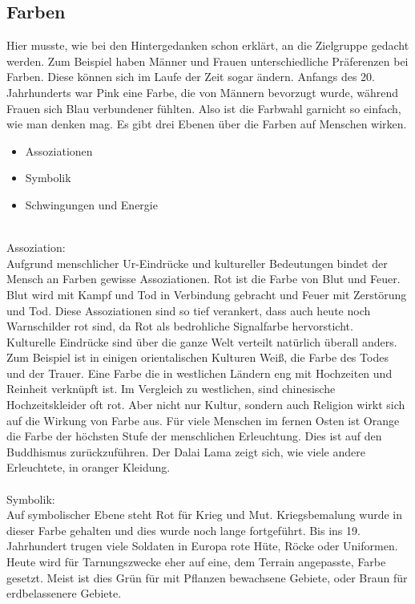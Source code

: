 \subsection{Farben}
Hier musste, wie bei den Hintergedanken schon erklärt, an die Zielgruppe gedacht werden. Zum Beispiel haben Männer und Frauen unterschiedliche Präferenzen bei Farben. Diese können sich im Laufe der Zeit sogar ändern. Anfangs des 20. Jahrhunderts war Pink eine Farbe, die von Männern bevorzugt wurde, während Frauen sich Blau verbundener fühlten.\cite{farbgeschlecht} Also ist die Farbwahl garnicht so einfach, wie man denken mag. Es gibt drei Ebenen über die Farben auf Menschen wirken.\cite{farbwirkung}
\begin{itemize}
\item Assoziationen
\item Symbolik
\item Schwingungen und Energie 
\end{itemize}
\leavevmode \\
Assoziation:
\leavevmode \\
Aufgrund menschlicher Ur-Eindrücke und kultureller Bedeutungen bindet der Mensch an Farben gewisse Assoziationen. Rot ist die Farbe von Blut und Feuer. Blut wird mit Kampf und Tod in Verbindung gebracht und Feuer mit Zerstörung und Tod. Diese Assoziationen sind so tief verankert, dass auch heute noch Warnschilder rot sind, da Rot als bedrohliche Signalfarbe hervorsticht.\cite{farbwirkung}
\leavevmode \\
Kulturelle Eindrücke sind über die ganze Welt verteilt natürlich überall anders. Zum Beispiel ist in einigen orientalischen Kulturen Weiß, die Farbe des Todes und der Trauer. Eine Farbe die in westlichen Ländern eng mit Hochzeiten und Reinheit verknüpft ist. Im Vergleich zu westlichen, sind chinesische Hochzeitskleider oft rot. Aber nicht nur Kultur, sondern auch Religion wirkt sich auf die Wirkung von Farbe aus. Für viele Menschen im fernen Osten ist Orange die Farbe der höchsten Stufe der menschlichen Erleuchtung. Dies ist auf den Buddhismus zurückzuführen. Der Dalai Lama zeigt sich, wie viele andere Erleuchtete, in oranger Kleidung.\cite{farbwirkung}\cite{farbkultur}
\leavevmode \\
\leavevmode \\
Symbolik:
\leavevmode \\
Auf symbolischer Ebene steht Rot für Krieg und Mut. Kriegsbemalung wurde in dieser Farbe gehalten und dies wurde noch lange fortgeführt. Bis ins 19. Jahrhundert trugen viele Soldaten in Europa rote Hüte, Röcke oder Uniformen. Heute wird für Tarnungszwecke eher auf eine, dem Terrain angepasste, Farbe gesetzt. Meist ist dies Grün für mit Pflanzen bewachsene Gebiete, oder Braun für erdbelassenere Gebiete.\cite{farbwirkung}
